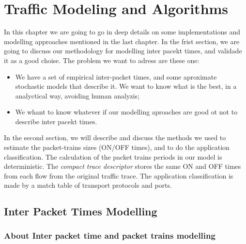 \chapter{Traffic Modeling and Algorithms}\label{ch:modeling-evaluation}

In this chapter we are going to go in deep details on some implementations and modelling approaches mentioned in the last chapter. In the frist section, we are going to discuss our methodology for modelling inter pacekt times, and validade it as a good choise. The problem we want to adress are these one:

\begin{itemize}
	
	\item We have a set of empirical inter-packet times, and some aproximate stochastic models that describe it. We want to know what is the best, in a analyctical way, avoiding human analyzis;
	
	\item We whant to know whatever if our modelling aproaches are good ot not to describe inter pacekt times.

\end{itemize}


In the second section, we will describe and discuss the methods we used to estimate the packet-trains sizes (ON/OFF times), and to do the application classification. The calculation of the packet trains periods in our model is deterministic. The \textit{compact trace descriptor} stores the same ON and OFF times from each flow from the original traffic trace. The application classification is made by a match table of transport protocols and ports. 


\section{Inter Packet Times Modelling}

\subsection{About Inter packet time and packet trains modelling}


